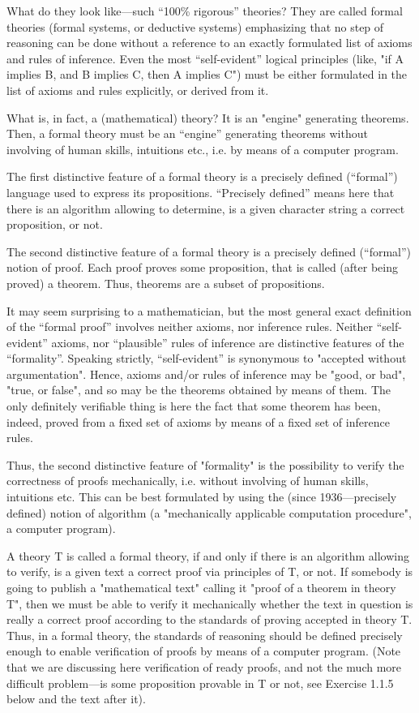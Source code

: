 What do they look like---such ``100\% rigorous'' theories?
They are called formal theories (formal systems, or deductive systems) emphasizing that no step of reasoning can be done without a reference to an exactly formulated list of axioms and rules of inference.
Even the most ``self-evident'' logical principles (like, "if A implies B, and B implies C, then A implies C") must be either formulated in the list
of axioms and rules explicitly, or derived from it.

What is, in fact, a (mathematical) theory? It is an "engine" generating theorems.
Then, a formal theory must be an ``engine'' generating theorems without involving of human skills, intuitions etc., i.e. by means of a computer program.

The first distinctive feature of a formal theory is a precisely defined (``formal'') language used to express its propositions.
``Precisely defined'' means here that there is an algorithm allowing to determine, is a given character string a correct proposition, or not.

The second distinctive feature of a formal theory is a precisely defined (``formal'') notion of proof.
Each proof proves some proposition, that is called (after being proved) a theorem. Thus, theorems are a subset of propositions.

It may seem surprising to a mathematician, but the most general exact definition of the ``formal proof'' involves neither axioms, nor inference rules. Neither ``self-evident'' axioms, nor ``plausible'' rules of inference are distinctive features of the ``formality''.
Speaking strictly, ``self-evident'' is synonymous to "accepted without argumentation".
Hence, axioms and/or rules of inference may be "good, or bad", "true, or false", and so may be the theorems obtained by means of them.
The only definitely verifiable thing is here the fact that some theorem has been, indeed, proved from a fixed set of axioms by means of a fixed set of inference rules.

Thus, the second distinctive feature of "formality" is the possibility to verify the correctness of proofs mechanically, i.e. without involving of human skills, intuitions etc. This can be best formulated by using the (since 1936---precisely defined) notion of algorithm (a "mechanically applicable computation procedure", a computer program).

A theory T is called a formal theory, if and only if there is an algorithm allowing to verify, is a given text a correct proof via principles of T, or not. If somebody is going to publish a "mathematical text" calling it "proof of a theorem in theory T", then we must be able to verify it mechanically whether the text in question is really a correct proof according to the standards of proving accepted in theory T. Thus, in a formal theory, the standards of reasoning should be defined precisely enough to enable verification of proofs by means of a computer program. (Note that we are discussing here verification of ready proofs, and not the much more difficult problem---is some proposition provable in T or not, see Exercise 1.1.5 below and the text after it).

